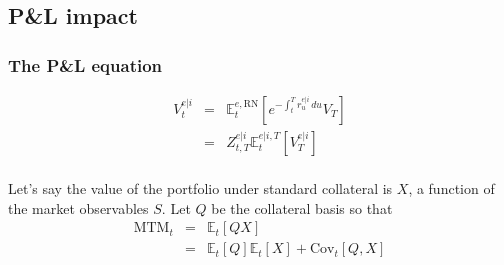 \documentclass[11pt,english]{amsart}
\newcommand{\RN}{\mathrm{RN}}
\newcommand{\MTM}{\mathrm{MTM}}
\newcommand{\EE}{\mathbb{E}}
\newcommand{\Cov}{\mathrm{Cov}}
\newcommand{\Q}{\Xi}
\theoremstyle{definition}
\newtheorem{rema}{Remark}
\begin{document}


%
%
%
%

 
\subsection{P\&L impact}%

\subsubsection{The P\&L equation}%

\begin{eqnarray}
  V^{e|i}_t &=&  \EE^{e,\RN}_t\left[ e^{-\int_t^T r^{e|i}_u\,du} V_T \right]  \\
  &=&  Z^{e|i}_{t,T} \EE^{e|i,T}_t[V^{e|i}_T]  \\
\end{eqnarray}


Let's say the value of the portfolio under standard collateral is $X$, a function of the market observables $S$. Let $Q$ be the collateral basis so that 
\begin{eqnarray}
  \MTM_t &=&  \EE_t\left[ Q X \right]  \\
  &=& \EE_t\left[ Q \right] \EE_t\left[ X \right]  + \Cov_t\left[ Q,X \right]  
\end{eqnarray}
\end{document}
